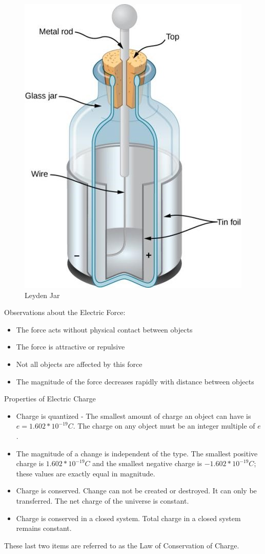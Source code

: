 \documentclass[14pt]{memoir}
\begin{document}
\begin{figure}[h]
\begin{center}
\includegraphics[scale=0.40]{fig/fig_05_06.jpg}
\caption{Leyden Jar}
\label{fig:05_06}
\end{center}
\end{figure}

Observations about the Electric Force:
\begin{itemize}
\item The force acts without physical contact between objects
\item The force is attractive or repulsive
\item Not all objects are affected by this force
\item The magnitude of the force decreases rapidly with distance between objects
\end{itemize}

Properties of Electric Charge
\begin{itemize}
\item Charge is quantized - The smallest amount of charge an object can have is $e = 1.602 * 10^{-19} C$. The charge on any object must be an integer multiple of $e$.
\item The magnitude of a change is independent of the type. The smallest positive charge is $1.602 * 10^{-19} C$ and the smallest negative charge is $-1.602 * 10^{-19} C$; these values are exactly equal in magnitude. 
\item Charge is conserved. Change can not be created or destroyed. It can only be transferred. The net charge of the universe is constant. 
\item Charge is conserved in a closed system. Total charge in a closed system remains constant.
\end{itemize}
These last two items are referred to as the Law of Conservation of Charge. 
\end{document}
